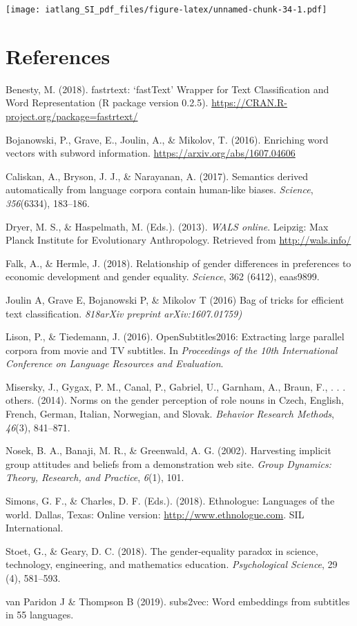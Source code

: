 \documentclass[]{article}
\begin{document}
\texttt{[image: iatlang\_SI\_pdf\_files/figure-latex/unnamed-chunk-34-1.pdf]}

\hypertarget{references}{%
\section{References}\label{references}}

Benesty, M. (2018). fastrtext: `fastText' Wrapper for Text
Classification and Word Representation (R package version 0.2.5).
\url{https://CRAN.R-project.org/package=fastrtext/}

Bojanowski, P., Grave, E., Joulin, A., \& Mikolov, T. (2016). Enriching
word vectors with subword information.
\url{https://arxiv.org/abs/1607.04606}

Caliskan, A., Bryson, J. J., \& Narayanan, A. (2017). Semantics derived
automatically from language corpora contain human-like biases.
\emph{Science}, \emph{356}(6334), 183--186.

Dryer, M. S., \& Haspelmath, M. (Eds.). (2013). \emph{WALS online}.
Leipzig: Max Planck Institute for Evolutionary Anthropology. Retrieved
from \url{http://wals.info/}

Falk, A., \& Hermle, J. (2018). Relationship of gender differences in
preferences to economic development and gender equality. \emph{Science},
362 (6412), eaas9899.

Joulin A, Grave E, Bojanowski P, \& Mikolov T (2016) Bag of tricks for
efficient text classification. \emph{818arXiv preprint
arXiv:1607.01759)}

Lison, P., \& Tiedemann, J. (2016). OpenSubtitles2016: Extracting large
parallel corpora from movie and TV subtitles. In \emph{Proceedings of
the 10th International Conference on Language Resources and Evaluation}.

Misersky, J., Gygax, P. M., Canal, P., Gabriel, U., Garnham, A., Braun,
F., . . . others. (2014). Norms on the gender perception of role nouns
in Czech, English, French, German, Italian, Norwegian, and Slovak.
\emph{Behavior Research Methods}, \emph{46}(3), 841--871.

Nosek, B. A., Banaji, M. R., \& Greenwald, A. G. (2002). Harvesting
implicit group attitudes and beliefs from a demonstration web site.
\emph{Group Dynamics: Theory, Research, and Practice}, \emph{6}(1), 101.

Simons, G. F., \& Charles, D. F. (Eds.). (2018). Ethnologue: Languages
of the world. Dallas, Texas: Online version:
\url{http://www.ethnologue.com}. SIL International.

Stoet, G., \& Geary, D. C. (2018). The gender-equality paradox in
science, technology, engineering, and mathematics education.
\emph{Psychological Science}, 29 (4), 581--593.

van Paridon J \& Thompson B (2019). subs2vec: Word embeddings from
subtitles in 55 languages.
\end{document}
